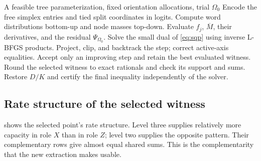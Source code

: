 \documentclass[11pt,a4paper]{article}
\newcommand{\Mbar}{\overline M}
\begin{document}
\begin{algorithm}[H]
\caption{Search for a shared-extraction witness}\label{alg:search}
\begin{algorithmic}[1]
\Require A feasible tree parameterization, fixed orientation allocations, trial $\Omega_0$
\State Encode the free simplex entries and tied split coordinates in logits.
\State Compute word distributions bottom-up and node masses top-down.
  \State Evaluate $f_j$, $\Mbar$, their derivatives, and the residual $\Psi_{\Omega_0}$.
  \State Solve the small dual of \cref{eq:sqp} using inverse L-BFGS products.
  \State Project, clip, and backtrack the step; correct active-axis equalities.
  \State Accept only an improving step and retain the best evaluated witness.
\EndWhile
\State Round the selected witness to exact rationals and check its support and sums.
\State Restore $D/K$ and certify the final inequality independently of the solver.
\end{algorithmic}
\end{algorithm}

\subsection{Rate structure of the selected witness}

 shows the selected point's rate structure. Level three supplies relatively more capacity in role $X$ than in role $Z$; level two supplies the opposite pattern. Their complementary rows give almost equal shared sums. This is the complementarity that the new extraction makes usable.
\end{document}
